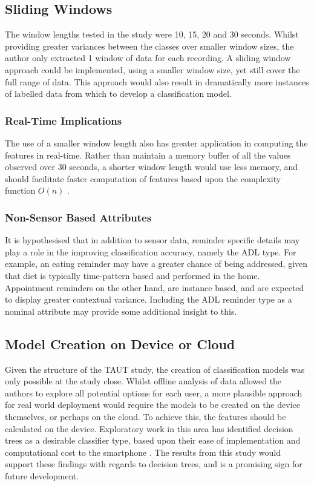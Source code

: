 \subsection{Sliding Windows}
The window lengths tested in the study were 10, 15, 20 and 30 seconds. Whilst providing greater variances between the classes over smaller window sizes, the author only extracted 1 window of data for each recording. A sliding window approach could be implemented, using a smaller window size, yet still cover the full range of data. This approach would also result in dramatically more instances of labelled data from which to develop a classification model.

\subsubsection{Real-Time Implications}
The use of a smaller window length also has greater application in computing the features in real-time. Rather than maintain a memory buffer of all the values observed over 30 seconds, a shorter window length would use less memory, and should facilitate faster computation of features based upon the complexity function $O(n)$ \cite{Aho1974}.

\subsubsection{Non-Sensor Based Attributes}
It is hypothesised that in addition to sensor data, reminder specific details may play a role in the improving classification accuracy, namely the ADL type. For example, an eating reminder may have a greater chance of being addressed, given that diet is typically time-pattern based and performed in the home. Appointment reminders on the other hand, are instance based, and are expected to display greater contextual variance. Including the ADL reminder type as a nominal attribute may provide some additional insight to this.

\subsection{Model Creation on Device or Cloud}
Given the structure of the TAUT study, the creation of classification models was only possible at the study close. Whilst offline analysis of data allowed the authors to explore all potential options for each user, a more plausible approach for real world deployment would require the models to be created on the device themselves, or perhaps on the cloud.
To achieve this, the features should be calculated on the device. Exploratory work in this area has identified decision trees as a desirable classifier type, based upon their ease of implementation and computational cost to the smartphone \cite{Guinness2015}. The results from this study would support these findings with regards to decision trees, and is a promising sign for future development. 

